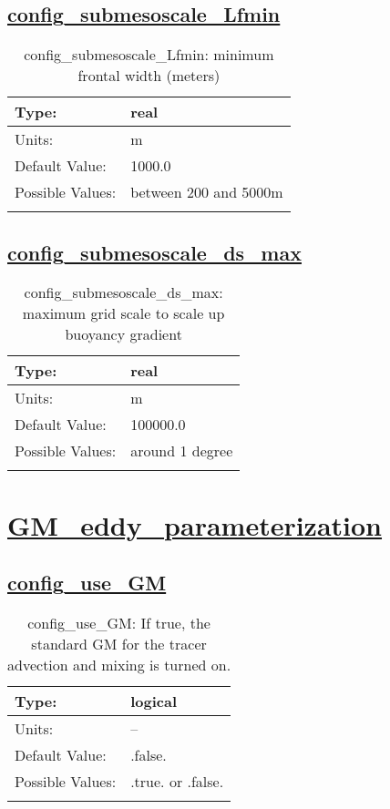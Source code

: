 \subsection[config\_submesoscale\_Lfmin]{\hyperref[sec:nm_tab_submesoscale_eddy_parameterization]{config\_submesoscale\_Lfmin}}
\label{subsec:nm_sec_config_submesoscale_Lfmin}
\begin{center}
\begin{longtable}{| p{2.0in} || p{4.0in} |}
    \hline
    Type: & real \\
    \hline
    Units: & \si{m} \\
    \hline
    Default Value: & 1000.0 \\
    \hline
    Possible Values: & between 200 and 5000m \\
    \hline
    \caption{config\_submesoscale\_Lfmin: minimum frontal width (meters)}
\end{longtable}
\end{center}
\subsection[config\_submesoscale\_ds\_max]{\hyperref[sec:nm_tab_submesoscale_eddy_parameterization]{config\_submesoscale\_ds\_max}}
\label{subsec:nm_sec_config_submesoscale_ds_max}
\begin{center}
\begin{longtable}{| p{2.0in} || p{4.0in} |}
    \hline
    Type: & real \\
    \hline
    Units: & \si{m} \\
    \hline
    Default Value: & 100000.0 \\
    \hline
    Possible Values: & around 1 degree \\
    \hline
    \caption{config\_submesoscale\_ds\_max: maximum grid scale to scale up buoyancy gradient}
\end{longtable}
\end{center}
\section[GM\_eddy\_parameterization]{\hyperref[sec:nm_tab_GM_eddy_parameterization]{GM\_eddy\_parameterization}}
\label{sec:nm_sec_GM_eddy_parameterization}
\subsection[config\_use\_GM]{\hyperref[sec:nm_tab_GM_eddy_parameterization]{config\_use\_GM}}
\label{subsec:nm_sec_config_use_GM}
\begin{center}
\begin{longtable}{| p{2.0in} || p{4.0in} |}
    \hline
    Type: & logical \\
    \hline
    Units: & -- \\
    \hline
    Default Value: & .false. \\
    \hline
    Possible Values: & .true. or .false. \\
    \hline
    \caption{config\_use\_GM: If true, the standard GM for the tracer advection and mixing is turned on.}
\end{longtable}
\end{center}
